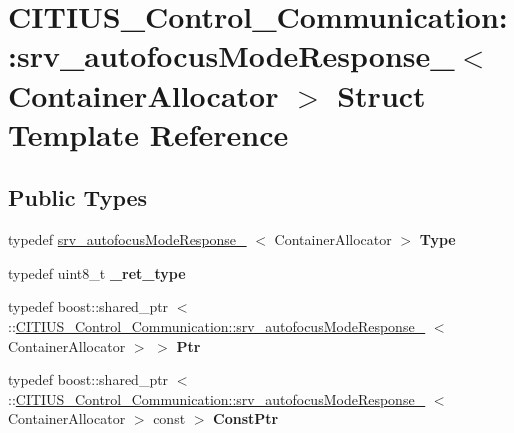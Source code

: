 \hypertarget{struct_c_i_t_i_u_s___control___communication_1_1srv__autofocus_mode_response__}{\section{\-C\-I\-T\-I\-U\-S\-\_\-\-Control\-\_\-\-Communication\-:\-:srv\-\_\-autofocus\-Mode\-Response\-\_\-$<$ \-Container\-Allocator $>$ \-Struct \-Template \-Reference}
\label{struct_c_i_t_i_u_s___control___communication_1_1srv__autofocus_mode_response__}
}
\subsection*{\-Public \-Types}
\begin{DoxyCompactItemize}
\item 
\hypertarget{struct_c_i_t_i_u_s___control___communication_1_1srv__autofocus_mode_response___a2372a9bdf43f4a736f9871f8a70a9038}{typedef \*
\hyperlink{struct_c_i_t_i_u_s___control___communication_1_1srv__autofocus_mode_response__}{srv\-\_\-autofocus\-Mode\-Response\-\_\-}\*
$<$ \-Container\-Allocator $>$ {\bfseries \-Type}}\label{struct_c_i_t_i_u_s___control___communication_1_1srv__autofocus_mode_response___a2372a9bdf43f4a736f9871f8a70a9038}

\item 
\hypertarget{struct_c_i_t_i_u_s___control___communication_1_1srv__autofocus_mode_response___afedcc3303c4c62e1944dae83e59ab1b6}{typedef uint8\-\_\-t {\bfseries \-\_\-ret\-\_\-type}}\label{struct_c_i_t_i_u_s___control___communication_1_1srv__autofocus_mode_response___afedcc3303c4c62e1944dae83e59ab1b6}

\item 
\hypertarget{struct_c_i_t_i_u_s___control___communication_1_1srv__autofocus_mode_response___ab27d1d593a7c1e4d5e5e7ec14e8c31d8}{typedef boost\-::shared\-\_\-ptr\*
$<$ \-::\hyperlink{struct_c_i_t_i_u_s___control___communication_1_1srv__autofocus_mode_response__}{\-C\-I\-T\-I\-U\-S\-\_\-\-Control\-\_\-\-Communication\-::srv\-\_\-autofocus\-Mode\-Response\-\_\-}\*
$<$ \-Container\-Allocator $>$ $>$ {\bfseries \-Ptr}}\label{struct_c_i_t_i_u_s___control___communication_1_1srv__autofocus_mode_response___ab27d1d593a7c1e4d5e5e7ec14e8c31d8}

\item 
\hypertarget{struct_c_i_t_i_u_s___control___communication_1_1srv__autofocus_mode_response___a082781b76a88eb0890cf2a936ae7561a}{typedef boost\-::shared\-\_\-ptr\*
$<$ \-::\hyperlink{struct_c_i_t_i_u_s___control___communication_1_1srv__autofocus_mode_response__}{\-C\-I\-T\-I\-U\-S\-\_\-\-Control\-\_\-\-Communication\-::srv\-\_\-autofocus\-Mode\-Response\-\_\-}\*
$<$ \-Container\-Allocator $>$ const  $>$ {\bfseries \-Const\-Ptr}}\label{struct_c_i_t_i_u_s___control___communication_1_1srv__autofocus_mode_response___a082781b76a88eb0890cf2a936ae7561a}

\end{DoxyCompactItemize}

